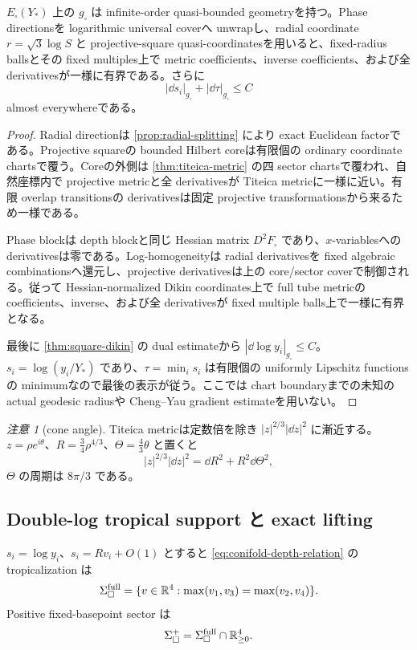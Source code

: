 \documentclass[11pt,a4paper]{ltjsarticle}
\newcommand{\Sigfull}{\Sigma_{\square}^{\mathrm{full}}}
\newcommand{\Sigplus}{\Sigma_{\square}^{+}}
\newcommand{\gsq}{g_{\square}}\newcommand{\omsq}{\omega_{\square}}
\newcommand{\Fbox}{F_{\square}}\newcommand{\ddc}{\sqrt{-1}\,\partial\bar\partial}
\theoremstyle{plain}
\theoremstyle{definition}
\theoremstyle{remark}
\newtheorem{remark}[theorem]{注意}\newtheorem{warning}[theorem]{警告}
\begin{document}
\begin{proposition}\label{prop:square-qbg}
$E_{\square}(Y_*)$ 上の $\gsq$ は infinite-order quasi-bounded geometryを持つ。Phase directionsを logarithmic universal coverへ unwrapし、radial coordinate $r=\sqrt3\log S$ と projective-square quasi-coordinatesを用いると、fixed-radius ballsとその fixed multiples上で metric coefficients、inverse coefficients、および全 derivativesが一様に有界である。さらに
\[
 |\dd s_i|_{\gsq}+|\dd\tau|_{\gsq}\le C
\]
almost everywhereである。
\end{proposition}

\begin{proof}
Radial directionは \cref{prop:radial-splitting} により exact Euclidean factorである。Projective squareの bounded Hilbert coreは有限個の ordinary coordinate chartsで覆う。Coreの外側は \cref{thm:titeica-metric} の四 sector chartsで覆われ、自然座標内で projective metricと全 derivativesが Titeica metricに一様に近い。有限 overlap transitionsの derivativesは固定 projective transformationsから来るため一様である。

Phase blockは depth blockと同じ Hessian matrix $D^2\Fbox$ であり、$x$-variablesへの derivativesは零である。Log-homogeneityは radial derivativesを fixed algebraic combinationsへ還元し、projective derivativesは上の core/sector coverで制御される。従って Hessian-normalized Dikin coordinates上で full tube metricの coefficients、inverse、および全 derivativesが fixed multiple balls上で一様に有界となる。

最後に \cref{thm:square-dikin} の dual estimateから $|\dd\log y_i|_{\gsq}\le C$。$s_i=\log(y_i/Y_*)$ であり、$\tau=\min_i s_i$ は有限個の uniformly Lipschitz functionsの minimumなので最後の表示が従う。ここでは chart boundaryまでの未知の actual geodesic radiusや Cheng--Yau gradient estimateを用いない。
\end{proof}

\begin{remark}[cone angle]
Titeica metricは定数倍を除き $|z|^{2/3}|\dd z|^2$ に漸近する。$z=\rho e^{i\theta}$、$R=\frac34\rho^{4/3}$、$\Theta=\frac43\theta$ と置くと
\[
 |z|^{2/3}|\dd z|^2=\dd R^2+R^2\dd\Theta^2,
\]
$\Theta$ の周期は $8\pi/3$ である。
\end{remark}

\subsection{Double-log tropical support と exact lifting}
$s_i=\log y_i$、$s_i=Rv_i+O(1)$ とすると \cref{eq:conifold-depth-relation} の tropicalization は
\begin{equation}\label{eq:full-tropical-support}
 \Sigfull=\{v\in\RR^4:\max(v_1,v_3)=\max(v_2,v_4)\}.
\end{equation}
Positive fixed-basepoint sector は
\[
 \Sigplus=\Sigfull\cap\RR_{\ge0}^4.
\]
\end{document}
